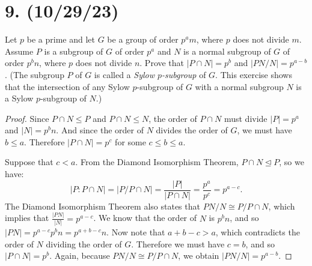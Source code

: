 \documentclass{article}
\begin{document}
\section*{9. (10/29/23)}

Let $p$ be a prime and let $G$ be a group of order $p^a m$, where $p$ does not divide $m$. Assume $P$ is a subgroup of $G$ of order $p^a$ and $N$ is a normal subgroup of $G$ of order $p^b n$, where $p$ does not divide $n$. Prove that $|P \cap N| = p^b$ and $|PN / N| = p^{a - b}$. (The subgroup $P$ of $G$ is called a \emph{Sylow $p$-subgroup} of $G$. This exercise shows that the intersection of any Sylow $p$-subgroup of $G$ with a normal subgroup $N$ is a Sylow $p$-subgroup of $N$.)

\begin{proof}
    Since $P \cap N \leq P$ and $P \cap N \leq N$, the order of $P \cap N$ must divide $|P| = p^a$ and $|N| = p^b n$. And since the order of $N$ divides the order of $G$, we must have $b \leq a$. Therefore $|P \cap N| = p^c$ for some $c \leq b \leq a$.

    Suppose that $c < a$. From the Diamond Isomorphism Theorem, $P \cap N \unlhd P$, so we have:
    \begin{equation*}
        |P : P \cap N| = |P / P \cap N| = \frac{|P|}{|P \cap N|} = \frac{p^a}{p^c} = p^{a - c}.
    \end{equation*}
    The Diamond Isomorphism Theorem also states that $PN / N \cong P / P \cap N$, which implies that $\frac{|PN|}{|N|} = p^{a - c}$. We know that the order of $N$ is $p^b n$, and so $|PN| = p^{a - c} p^b n = p^{a + b - c} n$. Now note that $a + b - c > a$, which contradicts the order of $N$ dividing the order of $G$. Therefore we must have $c = b$, and so $|P \cap N| = p^b$. Again, because $PN / N \cong P / P \cap N$, we obtain $|PN / N| = p^{a - b}$.
\end{proof}
\end{document}
